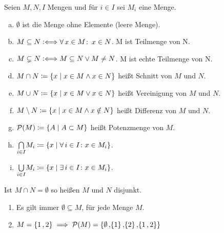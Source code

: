 \documentclass[../ana1.tex]{subfiles}
\begin{document}
\iftoggle{short}{}{\newpage}%

\begin{defi}[Mengenoperationen]
	Seien \(M,N,I \) Mengen und für \(i \in I \) sei \(M_{i} \) eine Menge.
	\begin{enumerate}[(a)]
		\item \(\emptyset \) ist die Menge ohne Elemente (leere Menge).
		\item \(M \subseteq N \mathrel{\vcentcolon\Longleftrightarrow} \forall \, x \in M \colon \, x \in N \). M ist Teilmenge von N.
		\item \(M \subsetneq N \mathrel{\vcentcolon\Longleftrightarrow} M \subseteq N \vee M \neq N \). M ist echte Teilmenge von N. 
		\item \(M \cap N \coloneqq \{x \; \vert \; x \in M \wedge x \in N\} \) heißt Schnitt von \(M \) und \(N \).
		\item \(M \cup N \coloneqq \{x \; \vert \; x \in M \vee x \in N\} \) heißt Vereinigung von \(M \) und \(N \).
		\item \(M \setminus N \coloneqq \{x \; \vert \; x \in M \wedge x \notin N\} \) heißt Differenz von \(M \) und \(N \).
		\item \(\mathcal{P}(M) \coloneqq \{A \; \vert \; A \subset M\} \) heißt Potenzmenge von \(M \).
		\item \(\underset{i \in I}{\bigcap} M_{i} \coloneqq \{x \; \vert \; \forall \, i \in I \colon x \in M_{i}\} \).
		\item \(\underset{i \in I}{\bigcup} M_{i} \coloneqq \{x \; \vert \; \exists \, i \in I \colon x \in M_{i}\} \).
	\end{enumerate}
	Ist \(M \cap N = \emptyset \) so heißen \(M \) und \(N \) disjunkt.
\end{defi}

\begin{bsp}\leavevmode
	\begin{enumerate}[(1)]
		\item Es gilt immer \(\emptyset \subseteq M \), für jede Menge \(M \).
		\item \(M = \{1\operatorname{,}2\} \implies \mathcal{P}(M) = \{\emptyset\operatorname{,}\{1\}\operatorname{,}\{2\}\operatorname{,}\{1\operatorname{,}2\}\} \)
	\end{enumerate}
\end{bsp}
\end{document}
